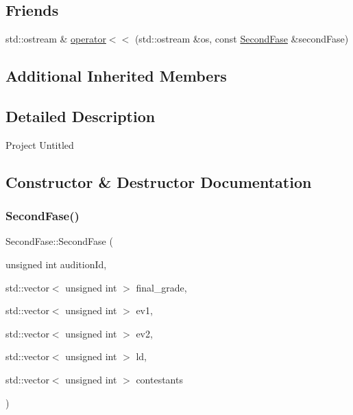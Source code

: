 \subsection*{Friends}
\begin{DoxyCompactItemize}
\item 
std\+::ostream \& \hyperlink{class_second_fase_a903774abcd5fa5ccf77bf90f0afbc5db}{operator$<$$<$} (std\+::ostream \&os, const \hyperlink{class_second_fase}{Second\+Fase} \&second\+Fase)
\end{DoxyCompactItemize}
\subsection*{Additional Inherited Members}


\subsection{Detailed Description}
Project Untitled 

\subsection{Constructor \& Destructor Documentation}
\mbox{\label{class_second_fase_a8e6899e5d9ed2b49e869e0c455192b7b}} 
\subsubsection{\texorpdfstring{Second\+Fase()}{SecondFase()}\hspace{0.1cm}{\footnotesize\ttfamily [1/2]}}
{\footnotesize\ttfamily Second\+Fase\+::\+Second\+Fase (\begin{DoxyParamCaption}\item[{unsigned int}]{audition\+Id,  }\item[{std\+::vector$<$ unsigned int $>$}]{final\+\_\+grade,  }\item[{std\+::vector$<$ unsigned int $>$}]{ev1,  }\item[{std\+::vector$<$ unsigned int $>$}]{ev2,  }\item[{std\+::vector$<$ unsigned int $>$}]{ld,  }\item[{std\+::vector$<$ unsigned int $>$}]{contestants }\end{DoxyParamCaption})}



